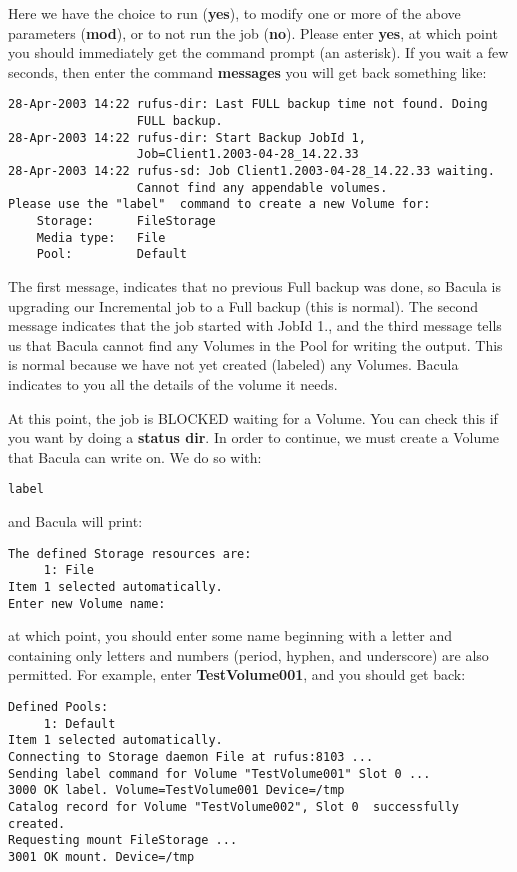 Here we have the choice to run ({\bf yes}), to modify one or more of the above
parameters ({\bf mod}), or to not run the job ({\bf no}). Please enter {\bf
yes}, at which point you should immediately get the command prompt (an
asterisk). If you wait a few seconds, then enter the command {\bf messages}
you will get back something like: 

\footnotesize
\begin{verbatim}
28-Apr-2003 14:22 rufus-dir: Last FULL backup time not found. Doing
                  FULL backup.
28-Apr-2003 14:22 rufus-dir: Start Backup JobId 1,
                  Job=Client1.2003-04-28_14.22.33
28-Apr-2003 14:22 rufus-sd: Job Client1.2003-04-28_14.22.33 waiting.
                  Cannot find any appendable volumes.
Please use the "label"  command to create a new Volume for:
    Storage:      FileStorage
    Media type:   File
    Pool:         Default
\end{verbatim}
\normalsize

The first message, indicates that no previous Full backup was done, so Bacula
is upgrading our Incremental job to a Full backup (this is normal). The second
message indicates that the job started with JobId 1., and the third message
tells us that Bacula cannot find any Volumes in the Pool for writing the
output. This is normal because we have not yet created (labeled) any Volumes.
Bacula indicates to you all the details of the volume it needs. 

At this point, the job is BLOCKED waiting for a Volume. You can check this if
you want by doing a {\bf status dir}. In order to continue, we must create a
Volume that Bacula can write on. We do so with: 

\footnotesize
\begin{verbatim}
label
\end{verbatim}
\normalsize

and Bacula will print: 

\footnotesize
\begin{verbatim}
The defined Storage resources are:
     1: File
Item 1 selected automatically.
Enter new Volume name:
\end{verbatim}
\normalsize

at which point, you should enter some name beginning with a letter and
containing only letters and numbers (period, hyphen, and underscore) are also
permitted. For example, enter {\bf TestVolume001}, and you should get back: 

\footnotesize
\begin{verbatim}
Defined Pools:
     1: Default
Item 1 selected automatically.
Connecting to Storage daemon File at rufus:8103 ...
Sending label command for Volume "TestVolume001" Slot 0 ...
3000 OK label. Volume=TestVolume001 Device=/tmp
Catalog record for Volume "TestVolume002", Slot 0  successfully created.
Requesting mount FileStorage ...
3001 OK mount. Device=/tmp
\end{verbatim}
\normalsize

